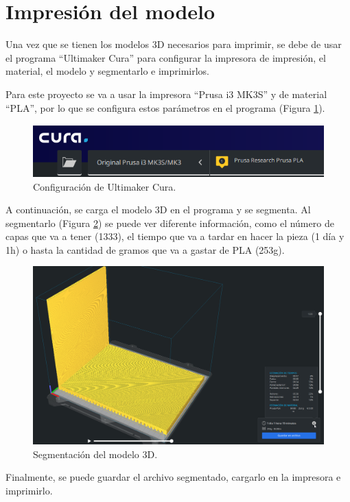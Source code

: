 \section{Impresión del modelo}
Una vez que se tienen los modelos 3D necesarios para imprimir, se debe de usar el programa “Ultimaker Cura” para configurar la impresora de impresión, el material, el modelo y segmentarlo e imprimirlos.

Para este proyecto se va a usar la impresora “Prusa i3 MK3S” y de material “PLA”, por lo que se configura estos parámetros en el programa (Figura \ref{fig:prusa}).

\begin{figure}[h] 
    \centering
    \includegraphics[width=.50\textwidth]{capitulos/capitulo9/prusa.png}
    \caption{Configuración de Ultimaker Cura.}
    \label{fig:prusa}
\end{figure}

A continuación, se carga el modelo 3D en el programa y se segmenta. Al segmentarlo (Figura \ref{fig:segmentation}) se puede ver diferente información, como el número de capas que va a tener (1333), el tiempo que va a tardar en hacer la pieza (1 día y 1h) o hasta la cantidad de gramos que va a gastar de PLA (253g).

\begin{figure}[h] 
    \centering
    \includegraphics[width=.90\textwidth]{capitulos/capitulo9/segmentation.png}
    \caption{Segmentación del modelo 3D.}
    \label{fig:segmentation}
\end{figure}

Finalmente, se puede guardar el archivo segmentado, cargarlo en la impresora e imprimirlo.

